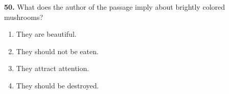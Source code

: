 \documentclass[12pt]{article}
\begin{document}
\par
\vspace{0.25\baselineskip}
\noindent\textbf{50.} What does the author of the passage imply about brightly colored mushrooms?
\begin{enumerate}[label=(\Alph*),leftmargin=*,itemsep=0.2em]
\item They are beautiful.
\item They should not be eaten.
\item They attract attention.
\item They should be destroyed.
\end{enumerate}
\par
\vspace{0.25\baselineskip}
\end{document}
